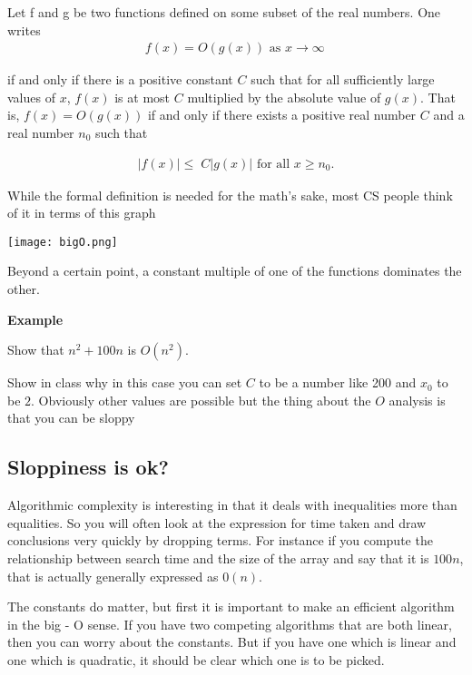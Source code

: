 \documentclass[12pt]{article}
\begin{document}
Let f and g be two functions defined on some subset of the real numbers. One writes
\begin{align*}
f(x)=O(g(x))\text{ as }x\to\infty\,
\end{align*}

if and only if there is a positive constant $C$ such that for all sufficiently large values of $x$, $f(x)$ is at most $C$ multiplied by the absolute value of $g(x)$. That is, $f(x) = O(g(x))$ if and only if there exists a positive real number $C$ and a real number $n_0$ such that

\begin{align*}
|f(x)| \le \; C |g(x)|\text{ for all }x \ge n_0.
\end{align*}

While the formal definition is needed for the math's sake, most CS people think of it in terms of this graph

\texttt{[image: bigO.png]}

Beyond a certain point, a constant multiple of one of the functions dominates the other.

\medskip

\textbf{Example}

Show that $n^2 + 100n$ is $O(n^2)$.

\medskip

Show in class why in this case you can set $C$ to be a number like 200 and $x_0$ to be $2$. Obviously other values are possible but the thing about the $O$ analysis is that you can be sloppy


\subsection*{Sloppiness is ok?}

Algorithmic complexity is interesting in that it deals with inequalities more than equalities. So you will often look at the expression for time taken and draw conclusions very quickly by dropping terms. For instance if you compute the relationship between search time and the size of the array and say that it is $100n$, that is actually generally expressed as $0(n)$. 

The constants do matter, but first it is important to make an efficient algorithm in the big - O sense. If you have two competing algorithms that are both linear, then you can worry about the constants. But if you have one which is linear and one which is quadratic, it should be clear which one is to be picked.
\end{document}
